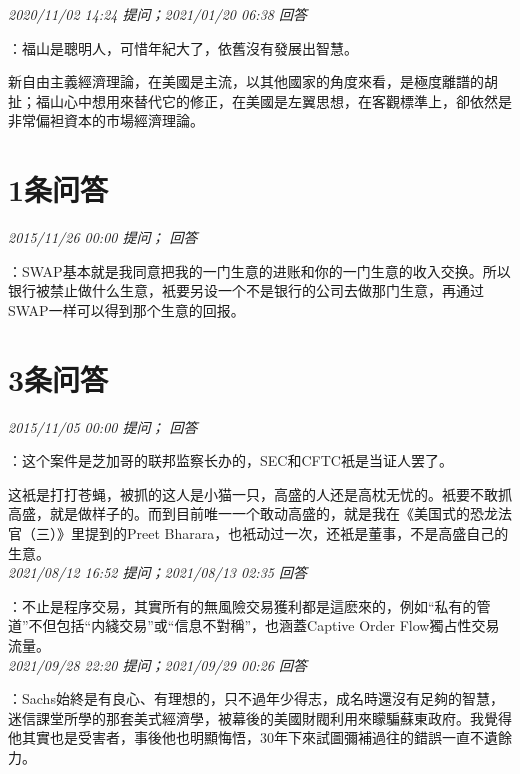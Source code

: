 \documentclass[twocolumn]{ctexart}
\begin{document}
\textit{\hfill\noindent\small 2020/11/02 14:24 提问；2021/01/20 06:38 回答}

：福山是聰明人，可惜年紀大了，依舊沒有發展出智慧。

新自由主義經濟理論，在美國是主流，以其他國家的角度來看，是極度離譜的胡扯；福山心中想用來替代它的修正，在美國是左翼思想，在客觀標準上，卻依然是非常偏袒資本的市場經濟理論。
\\

\section{1条问答}

\textit{\hfill\noindent\small 2015/11/26 00:00 提问； 回答}

：SWAP基本就是我同意把我的一门生意的进账和你的一门生意的收入交换。所以银行被禁止做什么生意，衹要另设一个不是银行的公司去做那门生意，再通过SWAP一样可以得到那个生意的回报。\\

\section{3条问答}

\textit{\hfill\noindent\small 2015/11/05 00:00 提问； 回答}

：这个案件是芝加哥的联邦监察长办的，SEC和CFTC衹是当证人罢了。

这衹是打打苍蝇，被抓的这人是小猫一只，高盛的人还是高枕无忧的。衹要不敢抓高盛，就是做样子的。而到目前唯一一个敢动高盛的，就是我在《美国式的恐龙法官（三）》里提到的Preet Bharara，也衹动过一次，还衹是董事，不是高盛自己的生意。\\

\textit{\hfill\noindent\small 2021/08/12 16:52 提问；2021/08/13 02:35 回答}

：不止是程序交易，其實所有的無風險交易獲利都是這麽來的，例如“私有的管道”不但包括“内綫交易”或“信息不對稱”，也涵蓋Captive Order Flow獨占性交易流量。
\\

\textit{\hfill\noindent\small 2021/09/28 22:20 提问；2021/09/29 00:26 回答}

：Sachs始終是有良心、有理想的，只不過年少得志，成名時還沒有足夠的智慧，迷信課堂所學的那套美式經濟學，被幕後的美國財閥利用來矇騙蘇東政府。我覺得他其實也是受害者，事後他也明顯悔悟，30年下來試圖彌補過往的錯誤一直不遺餘力。
\end{document}
